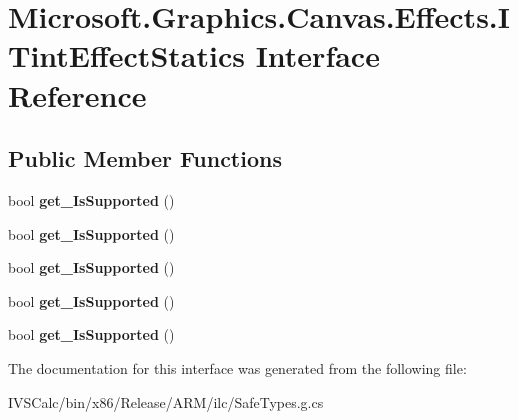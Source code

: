 \hypertarget{interface_microsoft_1_1_graphics_1_1_canvas_1_1_effects_1_1_i_tint_effect_statics}{}\section{Microsoft.\+Graphics.\+Canvas.\+Effects.\+I\+Tint\+Effect\+Statics Interface Reference}
\label{interface_microsoft_1_1_graphics_1_1_canvas_1_1_effects_1_1_i_tint_effect_statics}
\subsection*{Public Member Functions}
\begin{DoxyCompactItemize}
\item 
\mbox{\label{interface_microsoft_1_1_graphics_1_1_canvas_1_1_effects_1_1_i_tint_effect_statics_a8e352ee99d83d10d3bd137e1f4999af5}} 
bool {\bfseries get\+\_\+\+Is\+Supported} ()
\item 
\mbox{\label{interface_microsoft_1_1_graphics_1_1_canvas_1_1_effects_1_1_i_tint_effect_statics_a8e352ee99d83d10d3bd137e1f4999af5}} 
bool {\bfseries get\+\_\+\+Is\+Supported} ()
\item 
\mbox{\label{interface_microsoft_1_1_graphics_1_1_canvas_1_1_effects_1_1_i_tint_effect_statics_a8e352ee99d83d10d3bd137e1f4999af5}} 
bool {\bfseries get\+\_\+\+Is\+Supported} ()
\item 
\mbox{\label{interface_microsoft_1_1_graphics_1_1_canvas_1_1_effects_1_1_i_tint_effect_statics_a8e352ee99d83d10d3bd137e1f4999af5}} 
bool {\bfseries get\+\_\+\+Is\+Supported} ()
\item 
\mbox{\label{interface_microsoft_1_1_graphics_1_1_canvas_1_1_effects_1_1_i_tint_effect_statics_a8e352ee99d83d10d3bd137e1f4999af5}} 
bool {\bfseries get\+\_\+\+Is\+Supported} ()
\end{DoxyCompactItemize}


The documentation for this interface was generated from the following file\+:\begin{DoxyCompactItemize}
\item 
I\+V\+S\+Calc/bin/x86/\+Release/\+A\+R\+M/ilc/Safe\+Types.\+g.\+cs\end{DoxyCompactItemize}
